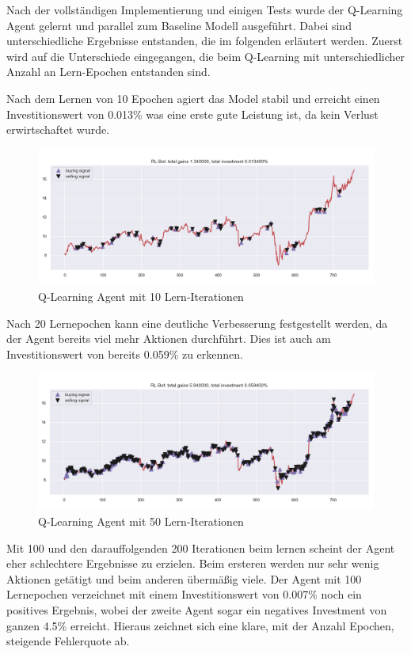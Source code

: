 Nach der vollständigen Implementierung und einigen Tests wurde der Q-Learning Agent gelernt und parallel zum Baseline Modell ausgeführt. Dabei sind unterschiedliche Ergebnisse entstanden, die im folgenden erläutert werden. Zuerst wird auf die Unterschiede eingegangen, die beim Q-Learning mit unterschiedlicher Anzahl an Lern-Epochen entstanden sind. 

Nach dem Lernen von 10 Epochen agiert das Model stabil und erreicht einen Investitionswert von 0.013\% was eine erste gute Leistung ist, da kein Verlust erwirtschaftet wurde.
\begin{figure}[H]
	\centering
	\includegraphics[scale=0.5]{../Topic3-TradingBot/plots/10iter-RL-bot.png} \caption{Q-Learning Agent mit 10 Lern-Iterationen}
\end{figure}

Nach 20 Lernepochen kann eine deutliche Verbesserung festgestellt werden, da der Agent bereits viel mehr Aktionen durchführt. Dies ist auch am Investitionswert von bereits 0.059\% zu erkennen.

\begin{figure}[H]
	\centering
	\includegraphics[scale=0.5]{../Topic3-TradingBot/plots/50iter-RL-bot.png} \caption{Q-Learning Agent mit 50 Lern-Iterationen}
\end{figure}

Mit 100 und den darauffolgenden 200 Iterationen beim lernen scheint der Agent eher schlechtere Ergebnisse zu erzielen. Beim ersteren werden nur sehr wenig Aktionen getätigt und beim anderen übermäßig viele. Der Agent mit 100 Lernepochen verzeichnet mit einem Investitionswert von 0.007\% noch ein positives Ergebnis, wobei der zweite Agent sogar ein negatives Investment von ganzen 4.5\% erreicht. Hieraus zeichnet sich eine klare, mit der Anzahl Epochen, steigende Fehlerquote ab. 

